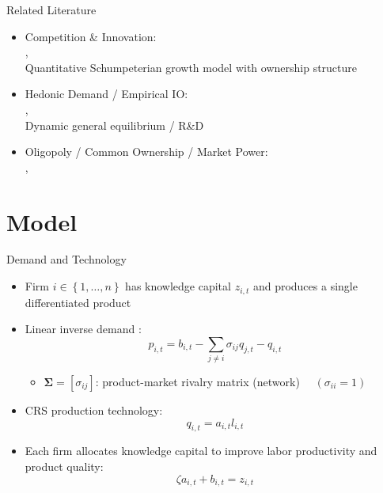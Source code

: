 \documentclass[
  10pt,
  aspectratio=169,   %
]{beamer}
\theoremstyle{plain}
\begin{document}
\begin{frame}{Related Literature}
  \begin{itemize}
    \item Competition \& Innovation: \\
          {\footnotesize\citet{d-Aspremont1988-je,Kamien1992-la,Aghion2001-yc,Aghion2005-vw,Acemoglu2012-bj,Aghion2013-nq,Bloom2013-pn,Lopez2019-sl,Peters2020-sd,Akcigit2021-ns,Akcigit2023-zl,Liu2022-iw,Cavenaile2023-lo}, \textbf{\citet{Hopenhayn2024-ya}}}\\
          \alert{Quantitative Schumpeterian growth model with ownership structure}
    \item Hedonic Demand / Empirical IO: \\
          {\footnotesize\citet{Lancaster1966-sg,Rosen1974-ep,Berry1995-lx,Nevo2001-ja}, \textbf{\citet{Pellegrino2024-dn,Ederer2024-rw}}}\\
          \alert{Dynamic general equilibrium / R\&D}
    \item Oligopoly / Common Ownership / Market Power: \\
          {\footnotesize\citet{Rubinstein1983-pi,Rotemberg1984-jz,Neary2003-sn,Atkeson2008-zc,Gutierrez2017-wl,He2017-ix,Azar2018-cc,Azar2022-cn,Autor2020-mr,Baqaee2020-eb,De_Loecker2020-jn,Azar2021-uh,Edmond2023-bg}, \textbf{\citet{Anton2023-ej,Anton2024-pw,Kini2024-kd}}}
  \end{itemize}
\end{frame}

\section{Model}

\begin{frame}{Demand and Technology}
  \label{static_game}
  \begin{itemize}
    \item Firm $i\in \left\{1,\ldots,n\right\}$ has knowledge capital $z_{i,t}$ and produces a single differentiated product
          \medskip{}\pause
    \item Linear inverse demand \citep{Pellegrino2024-dn}: \[p_{i,t}=b_{i,t}-\sum_{j\neq i}\sigma_{ij}q_{j,t} - q_{i,t}\]
          \begin{itemize}
            \item $\bm{\Sigma}=\left[\sigma_{ij}\right]$: product-market rivalry matrix (network) $\quad (\sigma_{ii} = 1)$
          \end{itemize}
          \medskip{}\pause
    \item CRS production technology: \[q_{i,t}=a_{i,t}l_{i,t}\]\pause
    \item Each firm allocates knowledge capital to improve labor productivity and product quality:
          \[
            \zeta a_{i,t}+b_{i,t}=z_{i,t}
          \]
  \end{itemize}
\end{frame}
\end{document}
